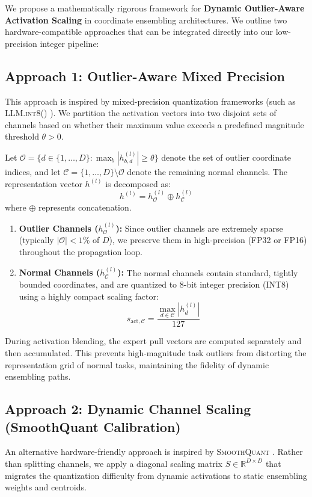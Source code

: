 \documentclass{article}
\theoremstyle{plain}
\theoremstyle{definition}
\theoremstyle{remark}
\begin{document}
We propose a mathematically rigorous framework for \textbf{Dynamic Outlier-Aware Activation Scaling} in coordinate ensembling architectures. We outline two hardware-compatible approaches that can be integrated directly into our low-precision integer pipeline:

\subsection{Approach 1: Outlier-Aware Mixed Precision}
This approach is inspired by mixed-precision quantization frameworks (such as \textsc{LLM.int8()} \cite{dettmers2022gpt3}). We partition the activation vectors into two disjoint sets of channels based on whether their maximum value exceeds a predefined magnitude threshold $\theta > 0$.

Let $\mathcal{O} = \{d \in \{1, \dots, D\} : \max_b |h_{b, d}^{(l)}| \geq \theta\}$ denote the set of outlier coordinate indices, and let $\mathcal{C} = \{1, \dots, D\} \setminus \mathcal{O}$ denote the remaining normal channels. The representation vector $h^{(l)}$ is decomposed as:
\begin{equation}
    h^{(l)} = h^{(l)}_{\mathcal{O}} \oplus h^{(l)}_{\mathcal{C}}
\end{equation}
where $\oplus$ represents concatenation.
\begin{enumerate}
    \item \textbf{Outlier Channels ($h^{(l)}_{\mathcal{O}}$):} Since outlier channels are extremely sparse (typically $|\mathcal{O}| < 1\%$ of $D$), we preserve them in high-precision (FP32 or FP16) throughout the propagation loop.
    \item \textbf{Normal Channels ($h^{(l)}_{\mathcal{C}}$):} The normal channels contain standard, tightly bounded coordinates, and are quantized to 8-bit integer precision (INT8) using a highly compact scaling factor:
    \begin{equation}
        s_{\text{act}, \mathcal{C}} = \frac{\max_{d \in \mathcal{C}} |h_d^{(l)}|}{127}
    \end{equation}
\end{enumerate}
During activation blending, the expert pull vectors are computed separately and then accumulated. This prevents high-magnitude task outliers from distorting the representation grid of normal tasks, maintaining the fidelity of dynamic ensembling paths.

\subsection{Approach 2: Dynamic Channel Scaling (SmoothQuant Calibration)}
An alternative hardware-friendly approach is inspired by \textsc{SmoothQuant} \cite{xiao2023smoothquant}. Rather than splitting channels, we apply a diagonal scaling matrix $S \in \mathbb{R}^{D \times D}$ that migrates the quantization difficulty from dynamic activations to static ensembling weights and centroids.
\end{document}
